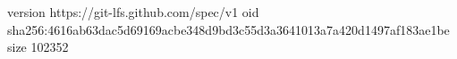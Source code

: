 version https://git-lfs.github.com/spec/v1
oid sha256:4616ab63dac5d69169acbe348d9bd3c55d3a3641013a7a420d1497af183ae1be
size 102352
